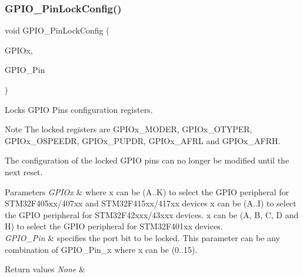 \subsubsection{\texorpdfstring{G\+P\+I\+O\+\_\+\+Pin\+Lock\+Config()}{GPIO\_PinLockConfig()}}
{\footnotesize\ttfamily void G\+P\+I\+O\+\_\+\+Pin\+Lock\+Config (\begin{DoxyParamCaption}\item[{G\+P\+I\+O\+\_\+\+Type\+Def $\ast$}]{G\+P\+I\+Ox,  }\item[{uint16\+\_\+t}]{G\+P\+I\+O\+\_\+\+Pin }\end{DoxyParamCaption})}



Locks G\+P\+IO Pins configuration registers. 

\begin{DoxyNote}{Note}
The locked registers are G\+P\+I\+Ox\+\_\+\+M\+O\+D\+ER, G\+P\+I\+Ox\+\_\+\+O\+T\+Y\+P\+ER, G\+P\+I\+Ox\+\_\+\+O\+S\+P\+E\+E\+DR, G\+P\+I\+Ox\+\_\+\+P\+U\+P\+DR, G\+P\+I\+Ox\+\_\+\+A\+F\+RL and G\+P\+I\+Ox\+\_\+\+A\+F\+RH. 

The configuration of the locked G\+P\+IO pins can no longer be modified until the next reset. 
\end{DoxyNote}

\begin{DoxyParams}{Parameters}
{\em G\+P\+I\+Ox} & where x can be (A..K) to select the G\+P\+IO peripheral for S\+T\+M32\+F405xx/407xx and S\+T\+M32\+F415xx/417xx devices x can be (A..I) to select the G\+P\+IO peripheral for S\+T\+M32\+F42xxx/43xxx devices. x can be (A, B, C, D and H) to select the G\+P\+IO peripheral for S\+T\+M32\+F401xx devices. \\
\hline
{\em G\+P\+I\+O\+\_\+\+Pin} & specifies the port bit to be locked. This parameter can be any combination of G\+P\+I\+O\+\_\+\+Pin\+\_\+x where x can be (0..15). \\
\hline
\end{DoxyParams}

\begin{DoxyRetVals}{Return values}
{\em None} & \\
\hline
\end{DoxyRetVals}
\mbox{\label{group___g_p_i_o___group1_gab28de41278e7f8c63d0851e2733b10df}} 
